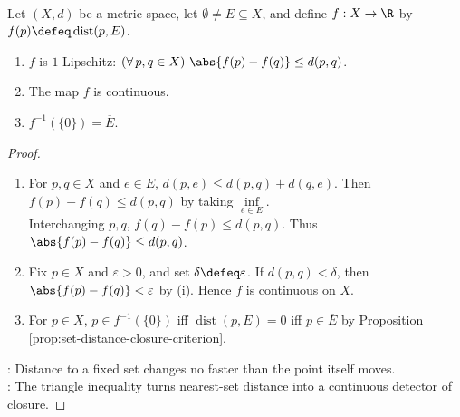 \begin{proposition} \label{prop:distance-to-set-is-continuous} \\
Let $(X,d)$ be a metric space, let $\emptyset\neq E\subseteq X$, and define $f:X\to\R$ by $f(p)\defeq\operatorname{dist}(p,E)$.
\begin{enumerate}[label=(\roman*)]
\setlength{\itemsep}{0pt}
\item $f$ is $1$-Lipschitz: $(\forall\,p,q\in X)\ \abs{f(p)-f(q)}\leq d(p,q)$.
\item The map $f$ is continuous.
\item $f^{-1}(\{0\})=\overline{E}$.
\end{enumerate}
\begin{proof}
\begin{enumerate}[label=(\roman*)]
\setlength{\itemsep}{0pt}
\item For $p,q\in X$ and $e\in E$, $d(p,e)\leq d(p,q)+d(q,e)$. Then $f(p)-f(q)\leq d(p,q)$ by taking $\inf\limits_{e\in E}$.\\
Interchanging $p,q$, $f(q)-f(p)\leq d(p,q)$. Thus $\abs{f(p)-f(q)}\leq d(p,q)$.
\item Fix $p\in X$ and $\varepsilon>0$, and set $\delta\defeq\varepsilon$. If $d(p,q)<\delta$, then $\abs{f(p)-f(q)}<\varepsilon$ by (i). Hence $f$ is continuous on $X$.
\item For $p\in X$, $p\in f^{-1}(\{0\})$ iff $\operatorname{dist}(p,E)=0$ iff $p\in\overline{E}$ by Proposition \ref{prop:set-distance-closure-criterion}.
\end{enumerate}
: Distance to a fixed set changes no faster than the point itself moves.\\
: The triangle inequality turns nearest-set distance into a continuous detector of closure.
\end{proof}
\end{proposition}

